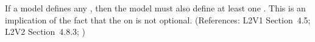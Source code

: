 If a model defines any \Species, then the model must also define at least
one \Compartment.  This is an implication of the fact that the
  on \Species is not optional.  (References: L2V1
Section~4.5; L2V2 Section~4.8.3; )
